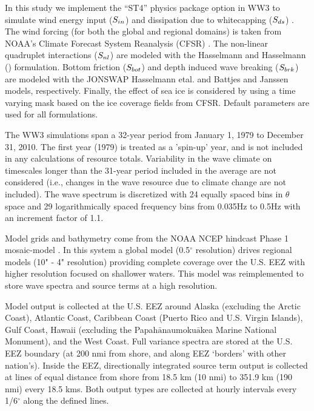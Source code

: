 In this study we implement the ``ST4'' physics package option in WW3 to simulate wind energy input ($S_{ in }$) and dissipation due to whitecapping ($S_{ ds }$) \citep{ardhuinObservationSwellDissipation2009}.
The wind forcing (for both the global and regional domains) is taken from NOAA's Climate Forecast System Reanalysis (CFSR) \citep{sahaNCEPClimateForecast2010}. The non-linear quadruplet interactions ($S_{ nl }$) are modeled with the Hasselmann and Hasselmann (\citeyear{hasselmannComputationsParameterizationsNonlinear1985}) formulation. Bottom friction ($S_{ bot }$) and depth induced wave breaking ($S_{ brk }$) are modeled with the JONSWAP Hasselmann etal. \citeyear{hasselmannMeasurementsWindwaveGrowth1973} and Battjes and Janssen \citeyear{battjesEnergyLossSetup1978} models, respectively. Finally, the effect of sea ice is considered by using a time varying mask based on the ice coverage fields from CFSR. Default parameters are used for all formulations.

The WW3 simulations span a 32-year period from January 1, 1979 to December 31, 2010. The first year (1979) is treated as a 'spin-up' year, and is not included in any calculations of resource totals. Variability in the wave climate on timescales longer than the 31-year period included in the average are not considered (i.e., changes in the wave resource due to climate change are not included). The wave spectrum is discretized with 24 equally spaced bins in $\theta$ space and 29 logarithmically spaced frequency bins from 0.035Hz to 0.5Hz with an increment factor of 1.1. 

Model grids and bathymetry come from the NOAA NCEP hindcast Phase 1 mosaic-model \citep{chawla2011wavewatch,chawla201230}. In this system a global model (0.5$^{\circ}$ resolution) drives regional models (10" - 4" resolution) providing complete coverage over the U.S. EEZ with higher resolution focused on shallower waters. This model was reimplemented to store wave spectra and source terms at a high resolution.

Model output is collected at the U.S. EEZ around Alaska (excluding the Arctic Coast), Atlantic Coast, Caribbean Coast (Puerto Rico and U.S. Virgin Islands), Gulf Coast, Hawaii (excluding the Papah$\bar{\text{a}}$naumoku$\bar{\text{a}}$kea Marine National Monument), and the West Coast. Full variance spectra are stored at the U.S. EEZ boundary (at 200 nmi from shore, and along EEZ `borders' with other nation's). Inside the EEZ, directionally integrated source term output is collected at lines of equal distance from shore from 18.5 km (10 nmi) to 351.9 km (190 nmi) every 18.5 kms. Both output types are collected at hourly intervals every 1/6$^{\circ}$ along the defined lines.

